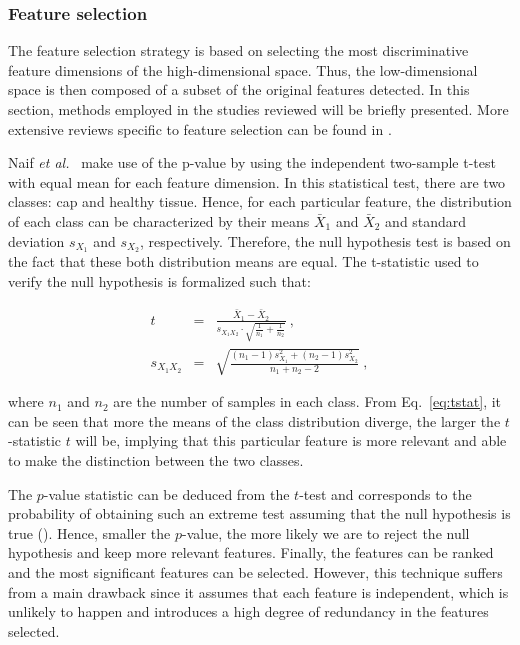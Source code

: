 \subsubsection{Feature selection}\label{subsubsec:chp3:img-clas:CADX:fea-ext:sel}
The feature selection strategy is based on selecting the most discriminative feature dimensions of the high-dimensional space.
Thus, the low-dimensional space is then composed of a subset of the original features detected.
In this section, methods employed in the studies reviewed will be briefly presented.
More extensive reviews specific to feature selection can be found in \cite{Saeys2007}.

Naif \textit{et al.}~\cite{Niaf2011,Niaf2012} make use of the p-value by using the independent two-sample t-test with equal mean for each feature dimension.
In this statistical test, there are two classes: \ac{cap} and healthy tissue.
Hence, for each particular feature, the distribution of each class can be characterized by their means $\bar{X}_1$ and $\bar{X}_2$ and standard deviation $s_{X_1}$ and $s_{X_2}$, respectively.
Therefore, the null hypothesis test is based on the fact that these both distribution means are equal.
The t-statistic used to verify the null hypothesis is formalized such that:

\begin{eqnarray}
t & = & \frac{\bar {X}_1 - \bar{X}_2}{s_{X_1X_2} \cdot \sqrt{\frac{1}{n_1}+\frac{1}{n_2}}} \ , \label{eq:tstat} \\
s_{X_1X_2} & = & \sqrt{\frac{(n_1-1)s_{X_1}^2+(n_2-1)s_{X_2}^2}{n_1+n_2-2}} \ , \nonumber
\end{eqnarray}

\noindent where $n_1$ and $n_2$ are the number of samples in each class.
From Eq.~\eqref{eq:tstat}, it can be seen that more the means of the class distribution diverge, the larger the $t$-statistic $t$ will be, implying that this particular feature is more relevant and able to make the distinction between the two classes. 

The $p$-value statistic can be deduced from the $t$-test and corresponds to the probability of obtaining such an extreme test assuming that the null hypothesis is true (\cite{Goodman1999}).
Hence, smaller the $p$-value, the more likely we are to reject the null hypothesis and keep more relevant features.
Finally, the features can be ranked and the most significant features can be selected.
However, this technique suffers from a main drawback since it assumes that each feature is independent, which is unlikely to happen and introduces a high degree of redundancy in the features selected.

